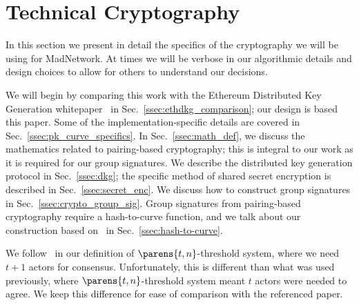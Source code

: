 \section{Technical Cryptography}
\label{sec:tech_crypto}

In this section we present in detail the specifics of the
cryptography we will be using for MadNetwork.
At times we will be verbose in our algorithmic details
and design choices to allow for others to understand our decisions.

We will begin by comparing this work with the
Ethereum Distributed Key Generation whitepaper~\cite{ethdkg}
in Sec.~\ref{ssec:ethdkg_comparison};
our design is based this paper.
Some of the implementation-specific details are covered in
Sec.~\ref{ssec:pk_curve_specifics}.
In Sec.~\ref{ssec:math_def}, we discuss the mathematics
related to pairing-based cryptography; this is integral to
our work as it is required for our group signatures.
We describe the distributed key generation protocol in
Sec.~\ref{ssec:dkg};
the specific method of shared secret encryption is
described in Sec.~\ref{ssec:secret_enc}.
We discuss how to construct group signatures in
Sec.~\ref{ssec:crypto_group_sig}.
Group signatures from pairing-based cryptography require
a hash-to-curve function, and we talk about our construction
based on~\cite{ft2012bnhashtocurve,boneh2019h2cBLS12}
in Sec.~\ref{ssec:hash-to-curve}.

We follow~\cite{ethdkg} in our definition of
$\parens{t,n}$-threshold system, where we need $t+1$ actors
for consensus.
Unfortunately, this is different than what was used previously,
where $\parens{t,n}$-threshold system meant $t$ actors were
needed to agree.
We keep this difference for ease of comparison with the referenced paper.








